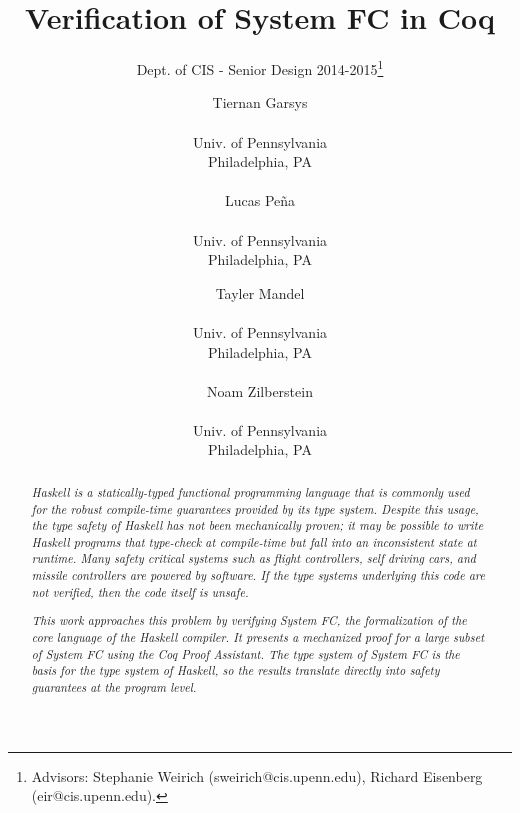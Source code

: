 \documentclass{sig-alternate}
\begin{document}
 

\title{Verification of System FC in Coq}
\subtitle{Dept. of CIS - Senior Design 2014-2015\thanks{Advisors: Stephanie Weirich (sweirich@cis.upenn.edu), Richard Eisenberg (eir@cis.upenn.edu).}}
\author{
  Tiernan Garsys \\  \\ Univ. of Pennsylvania \\ Philadelphia, PA\\\\
  Lucas Pe\~{n}a \\  \\ Univ. of Pennsylvania \\ Philadelphia, PA
  \and
  Tayler Mandel \\  \\ Univ. of Pennsylvania \\ Philadelphia, PA\\\\
  Noam Zilberstein \\  \\ Univ. of Pennsylvania \\ Philadelphia, PA
}
\date{}
\maketitle

\begin{abstract}
\textit{
Haskell is a statically-typed functional programming language that is commonly used for the robust compile-time guarantees provided by its type system. Despite this usage, the type safety of Haskell has not been mechanically proven; it may be possible to write Haskell programs that type-check at compile-time but fall into an inconsistent state at runtime. Many safety critical systems such as flight controllers, self driving cars, and missile controllers are powered by software. If the type systems underlying this code are not verified, then the code itself is unsafe.
}

\textit{
This work approaches this problem by verifying System FC, the formalization of the core language of the Haskell compiler. It presents a mechanized proof for a large subset of System FC using the Coq Proof Assistant.  The type system of System FC is the basis for the type system of Haskell, so the results translate directly into safety guarantees at the program level.
}
\end{abstract}
\end{document}
